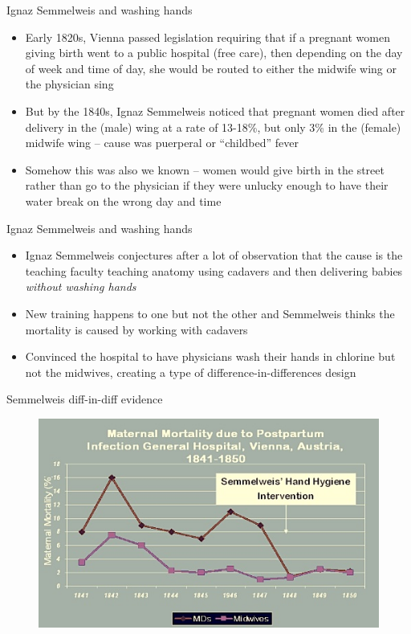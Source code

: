 \documentclass{beamer}
\begin{document}
\begin{frame}{Ignaz Semmelweis and washing hands}

\begin{itemize}
\item Early 1820s, Vienna passed legislation requiring that if a pregnant women giving birth went to a public hospital (free care), then depending on the day of week and time of day, she would be routed to either the midwife wing or the physician sing
\item But by the 1840s, Ignaz Semmelweis noticed that pregnant women died after delivery in the (male) wing at a rate of 13-18\%, but only 3\% in the (female) midwife wing -- cause was puerperal or “childbed” fever
\item Somehow this was also we known -- women would give birth in the street rather than go to the physician if they were unlucky enough to have their water break on the wrong day and time
\end{itemize}

\end{frame}

\begin{frame}{Ignaz Semmelweis and washing hands}

\begin{itemize}
\item Ignaz Semmelweis conjectures after a lot of observation that the cause is the teaching faculty teaching anatomy using cadavers and then delivering babies \emph{without washing hands}
\item New training happens to one but not the other and Semmelweis thinks the mortality is caused by working with cadavers
\item Convinced the hospital to have physicians wash their hands in chlorine but not the midwives, creating a type of difference-in-differences design 
\end{itemize}

\end{frame}

\begin{frame}{Semmelweis diff-in-diff evidence}

	\begin{figure}
	\includegraphics[scale=0.5]{./lecture_includes/semmelweis_graph.jpg}
	\end{figure}


\end{frame}
\end{document}
